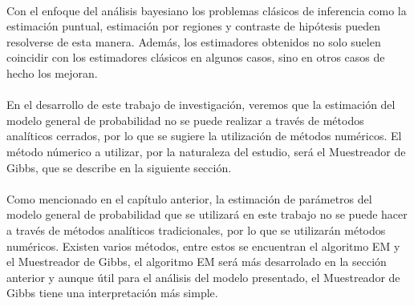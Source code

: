 \\
Con el enfoque del an\'alisis bayesiano los problemas cl\'asicos de inferencia como la estimaci\'on puntual, estimaci\'on por regiones y contraste de hip\'otesis pueden resolverse de esta manera. Adem\'as, los estimadores obtenidos no solo suelen coincidir con los estimadores cl\'asicos en algunos casos, sino en otros casos de hecho los mejoran.\\
\\
En el desarrollo de este trabajo de investigaci\'on, veremos que la estimaci\'on del modelo general de probabilidad no se puede realizar a trav\'es de m\'etodos anal\'iticos cerrados, por lo que se sugiere la utilizaci\'on de m\'etodos num\'ericos. El m\'etodo n\'umerico a utilizar, por la naturaleza del estudio, ser\'a el Muestreador de Gibbs, que se describe en la siguiente secci\'on.\\
\\
Como mencionado en el cap\'itulo anterior, la estimaci\'on de par\'ametros del modelo general de probabilidad que se utilizar\'a en este trabajo no se puede hacer a trav\'es de m\'etodos anal\'iticos tradicionales, por lo que se utilizar\'an m\'etodos num\'ericos. Existen varios m\'etodos, entre estos se encuentran el algoritmo EM y el Muestreador de Gibbs, el algoritmo EM ser\'a m\'as desarrolado en la secci\'on anterior y aunque \'util para el an\'alisis del modelo presentado, el Muestreador de Gibbs tiene una interpretaci\'on m\'as simple.\\
